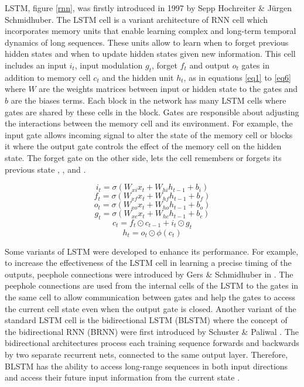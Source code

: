 \documentclass[12pt,a4paper]{article}
\begin{document}
LSTM, figure \ref{rnn}, was firstly introduced  in 1997 by Sepp  Hochreiter \& Jürgen Schmidhuber. The LSTM cell is a variant architecture of  RNN cell which incorporates memory units that enable learning complex and long-term temporal dynamics of long sequences. These units allow to learn when to forget previous hidden states and when to update hidden states given new information. This cell includes an input $i_t$, input modulation $g_t$, forget $f_t$ and output $o_t$ gates in addition to memory cell $c_t$ and the hidden unit $h_t$, as in equations \ref{eq1} to \ref{eq6} where $W$ are the weights matrices between input or hidden state to the gates and $b$ are the biases terms.  Each block in the network has many LSTM cells where gates are shared by these cells in the block. Gates are responsible about adjusting the interactions between the memory cell and its environment. For example, the input gate allows incoming signal  to alter the state of the memory cell or blocks it where the output gate controls the effect of the memory cell on the hidden state. The  forget gate on the other side, lets the cell remembers or forgets its  previous state  \cite{chen2015survey},\cite{chen2016lstm} ,\cite{gers2002learning} and \cite{donahue2015long}. 


\begin{equation}\label{eq1}
i_t= \sigma(W_{xi}x_t + W_{hi}h_{t-1}+b_i)
\end{equation}
\begin{equation}\label{eq2}
f_t= \sigma(W_{xf}x_t + W_{hf}h_{t-1}+b_f)
\end{equation}
\begin{equation}\label{eq3}
o_t= \sigma(W_{xo}x_t + W_{ho}h_{t-1}+b_o)
\end{equation}
\begin{equation}\label{eq4}
g_t= \sigma(W_{xc}x_t + W_{hc}h_{t-1}+b_c)
\end{equation}
\begin{equation}\label{eq5}
c_t= f_t \odot	 c_{t-1} +  i_t \odot	g_{t}
\end{equation}
\begin{equation}\label{eq6}
h_t= o_t \odot \phi(c_t)
\end{equation}


Some variants of LSTM were developed to enhance its performance. For example, to increase the effectiveness of the LSTM cell in learning a precise timing of the outputs, peephole connections were introduced  by Gers \& Schmidhuber in \cite{gers2002learning} . The peephole connections are used from the internal cells of the LSTM to the gates in the same cell to allow communication between gates and help the gates to access the current cell state even when the output gate is closed. Another variant of the standard LSTM cell is the bidirectional LSTM (BLSTM) where the concept of the bidirectional RNN (BRNN) were first introduced by Schuster \& Paliwal . The bidirectional architectures process each training sequence forwards and backwards by two separate recurrent nets, connected to the same output layer. Therefore, BLSTM has the ability to access long-range sequences in both input directions and access their future input information from the current state  \cite{graves2005framewise}.
\end{document}
